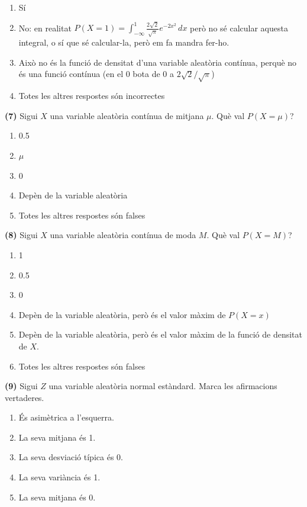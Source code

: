\documentclass[
]{book}
\providecommand{\tightlist}{%
  \setlength{\itemsep}{0pt}\setlength{\parskip}{0pt}}
\theoremstyle{definition}
\theoremstyle{definition}
\theoremstyle{definition}
\theoremstyle{remark}
\begin{document}
\begin{enumerate}
\def\labelenumi{\arabic{enumi}.}
\tightlist
\item
  Sí
\item
  No: en realitat \(P(X=1)=\int_{-\infty}^1 \frac{2\sqrt{2}}{\sqrt{\pi}} e^{-2x^2}\,dx\) però no sé calcular aquesta integral, o sí que sé calcular-la, però em fa mandra fer-ho.
\item
  Això no és la funció de densitat d'una variable aleatòria contínua, perquè no és una funció contínua (en el 0 bota de 0 a \(2\sqrt{2}/\sqrt{\pi}\))
\item
  Totes les altres respostes són incorrectes
\end{enumerate}

\textbf{(7)} Sigui \(X\) una variable aleatòria contínua de mitjana \(\mu\). Què val \(P(X=\mu)\)?

\begin{enumerate}
\def\labelenumi{\arabic{enumi}.}
\tightlist
\item
  0.5
\item
  \(\mu\)
\item
  0
\item
  Depèn de la variable aleatòria
\item
  Totes les altres respostes són falses
\end{enumerate}

\textbf{(8)} Sigui \(X\) una variable aleatòria contínua de moda \(M\). Què val \(P(X=M)\)?

\begin{enumerate}
\def\labelenumi{\arabic{enumi}.}
\tightlist
\item
  1
\item
  0.5
\item
  0
\item
  Depèn de la variable aleatòria, però és el valor màxim de \(P(X=x)\)
\item
  Depèn de la variable aleatòria, però és el valor màxim de la funció de densitat de \(X\).
\item
  Totes les altres respostes són falses
\end{enumerate}

\textbf{(9)} Sigui \(Z\) una variable aleatòria normal estàndard. Marca les afirmacions vertaderes.

\begin{enumerate}
\def\labelenumi{\arabic{enumi}.}
\tightlist
\item
  És asimètrica a l'esquerra.
\item
  La seva mitjana és 1.
\item
  La seva desviació típica és 0.
\item
  La seva variància és 1.
\item
  La seva mitjana és 0.
\end{enumerate}
\end{document}
